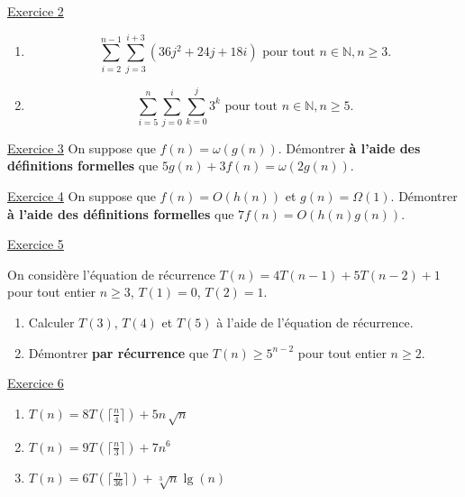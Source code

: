\documentclass[11pt]{article}
\begin{document}
\bigskip

\underline{Exercice 2} 

\begin{enumerate}[label=\alph*)]

     \item $$ \sum_{i=2}^{n-1} \sum_{j=3}^{i+3}\left( 36j^2+24j+18i \right)  \textrm{ pour tout } n \in \mathbb{N}, n\geq 3.$$
     
     
     \item $$ \sum_{i=5}^{n} \sum_{j=0}^{i}\sum_{k=0}^{j}3^k  \textrm{ pour tout } n \in \mathbb{N}, n\geq 5.$$
  

\end{enumerate}

\bigskip

\underline{Exercice 3} On suppose que $f(n) = \omega\left(g(n)\right)$. Démontrer \textbf{à l'aide des définitions formelles} que $5g(n) +3 f(n) = \omega \left(2g(n)\right)$.




\bigskip

\underline{Exercice 4}
On suppose que $f(n) = O\left(h(n)\right)$ et $g(n) = \Omega \left(1\right)$. Démontrer \textbf{à l'aide des définitions formelles} que $7f(n) =O \left( h(n) g(n)\right)$.

\bigskip


\underline{Exercice 5} 

On considère l’équation de récurrence $T(n)=4T(n-1) + 5T(n-2) +1$ pour tout entier $n \geq 3$, $T(1)=0$, $T(2)=1$.

\begin{enumerate}[label=\alph*)]

     \item Calculer $T(3)$, $T(4)$ et $T(5)$ à l'aide de l'équation de récurrence.
     
     
     \item Démontrer \textbf{par récurrence} que $T(n)\geq  5^{n-2}$ pour tout entier $n \geq 2$.

\end{enumerate}

\bigskip

\underline{Exercice 6} 



\begin{enumerate}[label=\alph*)]
   \item $T(n)=8 T \left( \lceil{\frac{n}{4}} \rceil\right) + 5 n \, \sqrt{n} $
     
     \item $T(n)=9T \left( \lceil{\frac{n}{3}} \rceil\right) + 7n^6 $

\item $T(n)=6 T \left( \lceil{\frac{n}{36}} \rceil\right) + \sqrt[3]{n} \lg(n) $

\end{enumerate}
\end{document}
